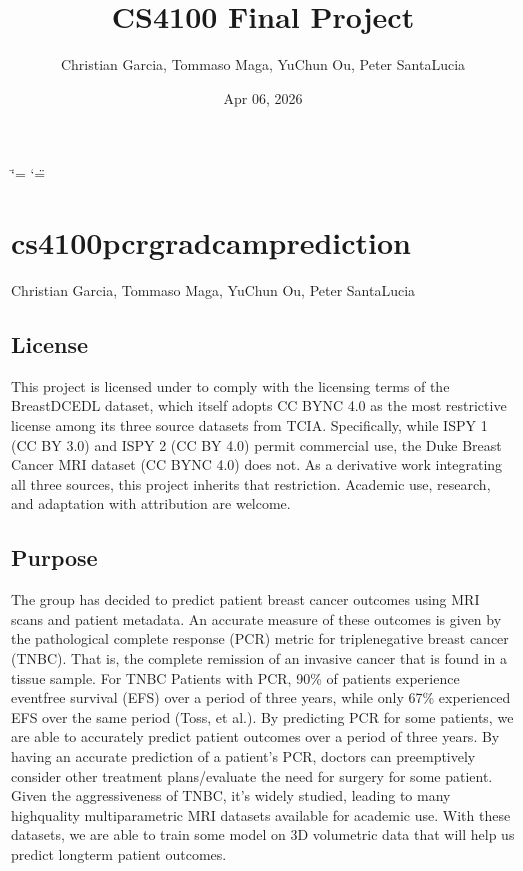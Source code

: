 \documentclass[letterpaper,10pt,english]{sphinxmanual}
\title{CS4100 Final Project}
\date{Apr 06, 2026}
\author{Christian Garcia, Tommaso Maga, Yu\sphinxhyphen{}Chun Ou, Peter SantaLucia}
\begin{document}
\ifdefined\shorthandoff
  \ifnum\catcode`\=\string=\active\shorthandoff{=}\fi
  \ifnum\catcode`\"=\active{}\fi
\fi

\pagestyle{empty}
\sphinxmaketitle
\pagestyle{plain}
\sphinxtableofcontents
\pagestyle{normal}
\label{\detokenize{index::doc}}



\chapter{cs4100\sphinxhyphen{}pcr\sphinxhyphen{}gradcam\sphinxhyphen{}prediction}
\label{\detokenize{index:cs4100-pcr-gradcam-prediction}}
\sphinxAtStartPar
{}

\sphinxAtStartPar
{} Christian Garcia, Tommaso Maga, Yu\sphinxhyphen{}Chun Ou, Peter SantaLucia


\section{License}
\label{\detokenize{index:license}}
\sphinxAtStartPar
This project is licensed under  to comply with the licensing terms of the BreastDCEDL dataset, which itself adopts CC BY\sphinxhyphen{}NC 4.0 as the most restrictive license among its three source datasets from TCIA. Specifically, while I\sphinxhyphen{}SPY 1 (CC BY 3.0) and I\sphinxhyphen{}SPY 2 (CC BY 4.0) permit commercial use, the Duke Breast Cancer MRI dataset (CC BY\sphinxhyphen{}NC 4.0) does not. As a derivative work integrating all three sources, this project inherits that restriction. Academic use, research, and adaptation with attribution are welcome.


\section{Purpose}
\label{\detokenize{index:purpose}}
\sphinxAtStartPar
The group has decided to predict patient breast cancer outcomes using MRI scans and patient metadata. An accurate measure of these outcomes is given by the pathological complete response (PCR) metric for triple\sphinxhyphen{}negative breast cancer (TNBC). That is, the complete remission of an invasive cancer that is found in a tissue sample. For TNBC Patients with PCR, 90\% of patients experience event\sphinxhyphen{}free survival (EFS) over a period of three years, while only 67\% experienced EFS over the same period (Toss, et al.). By predicting PCR for some patients, we are able to accurately predict patient outcomes over a period of three years.
By having an accurate prediction of a patient’s PCR, doctors can preemptively consider other treatment plans/evaluate the need for surgery for some patient. Given the aggressiveness of TNBC, it’s widely studied, leading to many high\sphinxhyphen{}quality multiparametric MRI datasets available for academic use. With these datasets, we are able to train some model on 3D volumetric data that will help us predict long\sphinxhyphen{}term patient outcomes.
\end{document}
